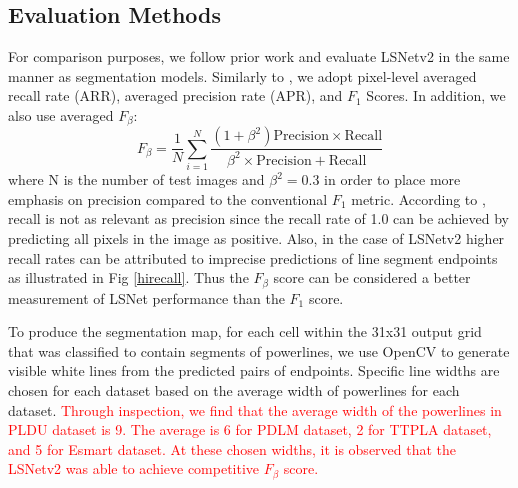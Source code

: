 \documentclass[journal]{IEEEtran}
\begin{document}
\subsection{Evaluation Methods}
For comparison purposes, we follow prior work \cite{XX, XX} and evaluate LSNetv2 in the same manner as segmentation models.
Similarly to \cite{Nguyen2020}, we adopt pixel-level averaged recall rate (ARR), averaged precision rate (APR), and $F_1$ Scores. In addition, we also use averaged $F_{\beta}$:
\begin{equation}
  F_{\beta} = \frac{1}{N} \sum_{i=1}^N  \frac{(1 + \beta^2)\text{Precision} \times \text{Recall}}{\beta^2 \times \text{Precision} + \text{Recall}} 
\end{equation}
where N is the number of test images and $\beta^2 = 0.3$ in order to place more emphasis on precision compared to the conventional $F_1$ metric. According to \cite{f_beta0, f_beta1}, recall is not as relevant as precision since the recall rate of 1.0 can be achieved by predicting all pixels in the image as positive. Also, in the case of LSNetv2 higher recall rates can be attributed to imprecise predictions of line segment endpoints as illustrated in Fig \ref{hirecall}. Thus the $F_{\beta}$ score can be considered a better measurement of LSNet performance than the $F_1$ score.

To produce the segmentation map, for each cell within the 31x31 output grid that was classified to contain segments of powerlines, we use OpenCV to generate visible white lines from the predicted pairs of endpoints. Specific line widths are chosen for each dataset based on the average width of powerlines for each dataset. \textcolor{red}{Through inspection, we find that the average width of the powerlines in PLDU dataset is 9. The average is 6 for PDLM dataset, 2 for TTPLA dataset, and 5 for Esmart dataset. At these chosen widths, it is observed that the LSNetv2 was able to achieve competitive $F_{\beta}$ score.} 
\end{document}
